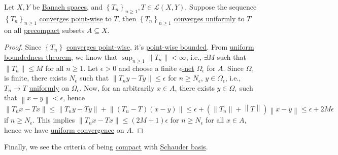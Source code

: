 \begin{theorem}\label{thm:convergence-on-compact-set}
	Let \(X, Y\) be \hyperref[def:Banach-space]{Banach spaces}, and \(\left\{ T_n \right\} _{n \geq 1}, T\in \mathcal{L} (X, Y)\). Suppose the sequence \(\left\{ T_n \right\} _{n \geq 1}\) \hyperref[def:point-wise-convergence]{converges point-wise} to \(T\), then \(\left\{ T_n \right\}_{n \geq 1}\) \hyperref[def:uniformly-convergence]{converges uniformly} to \(T\) on all \hyperref[def:precompact]{precompact} subsets \(A \subseteq X\).
\end{theorem}
\begin{proof}
	Since \(\left\{ T_n \right\} \) \hyperref[def:point-wise-convergence]{converges point-wise}, it's \hyperref[def:point-wise-bounded]{point-wise bounded}. From \hyperref[thm:uniform-boundedness]{uniform boundedness theorem}, we know that \(\sup _{n \geq 1} \left\lVert T_n\right\rVert < \infty \), i.e., \(\exists M\) such that \(\left\lVert T_n\right\rVert \leq M\) for all \(n \geq 1\). Let \(\epsilon > 0\) and choose a finite \hyperref[def:eps-net]{\(\epsilon \)-net} \(\Omega _\epsilon \)  for \(A\). Since \(\Omega _{\epsilon }\) is finite, there exists \(N_{\epsilon } \) such that \(\left\lVert T_n y - Ty\right\rVert \leq \epsilon\) for \(n \geq N_{\epsilon } \), \(y\in \Omega _{\epsilon }\), i.e., \(T_n \to T\) \hyperref[def:uniformly-convergence]{uniformly} on \(\Omega _\epsilon \). Now, for an arbitrarily \(x\in A\), there exists \(y\in \Omega _\epsilon \) such that \(\left\lVert x - y\right\rVert < \epsilon \), hence
	\[
		\left\lVert T_n x - Tx\right\rVert \leq \left\lVert T_n y - T y\right\rVert + \left\lVert (T_n - T)(x - y)\right\rVert \leq \epsilon + \left( \left\lVert T_n\right\rVert + \left\lVert T\right\rVert  \right) \left\lVert x - y \right\rVert \leq \epsilon + 2M\epsilon
	\]
	if \(n \geq N_{\epsilon } \). This implies \(\left\lVert T_n x - Tx\right\rVert \leq (2M+1)\epsilon \) for \(n \geq N_{\epsilon } \) for all \(x\in A\), hence we have \hyperref[def:uniformly-convergence]{uniform convergence} on \(A\).
\end{proof}

Finally, we see the criteria of being \hyperref[def:compact]{compact} with \hyperref[def:Schauder-basis]{Schauder basis}.

